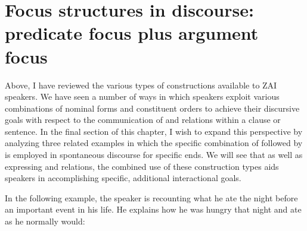 \section{Focus structures in discourse: predicate focus plus argument focus}\label{chiasmus}

Above, I have reviewed the various types of  constructions available to ZAI speakers. We have seen a number of ways in which speakers exploit various combinations of nominal forms and constituent orders to achieve their discursive goals with respect to the communication of  and  relations within a clause or sentence. In the final section of this chapter, I wish to expand this perspective by analyzing three related examples in which the specific combination of  followed by  is employed in spontaneous discourse for specific ends. We will see that as well as expressing  and  relations, the combined use of these construction types aids speakers in accomplishing specific, additional interactional goals. 

In the following example, the speaker is recounting what he ate the night before an important event in his life. He explains how he was hungry that night and ate as he normally would:

